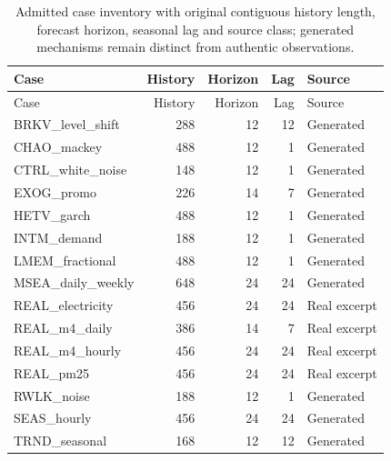 \begin{longtable}{lrrrl}
\caption{Admitted case inventory with original contiguous history length, forecast horizon, seasonal lag and source class; generated mechanisms remain distinct from authentic observations.}\label{tab:cases}\\
\toprule Case & History & Horizon & Lag & Source\\\midrule\endfirsthead
\toprule Case & History & Horizon & Lag & Source\\\midrule\endhead
BRKV\_level\_shift & 288 & 12 & 12 & Generated\\
CHAO\_mackey & 488 & 12 & 1 & Generated\\
CTRL\_white\_noise & 148 & 12 & 1 & Generated\\
EXOG\_promo & 226 & 14 & 7 & Generated\\
HETV\_garch & 488 & 12 & 1 & Generated\\
INTM\_demand & 188 & 12 & 1 & Generated\\
LMEM\_fractional & 488 & 12 & 1 & Generated\\
MSEA\_daily\_weekly & 648 & 24 & 24 & Generated\\
REAL\_electricity & 456 & 24 & 24 & Real excerpt\\
REAL\_m4\_daily & 386 & 14 & 7 & Real excerpt\\
REAL\_m4\_hourly & 456 & 24 & 24 & Real excerpt\\
REAL\_pm25 & 456 & 24 & 24 & Real excerpt\\
RWLK\_noise & 188 & 12 & 1 & Generated\\
SEAS\_hourly & 456 & 24 & 24 & Generated\\
TRND\_seasonal & 168 & 12 & 12 & Generated\\
\bottomrule
\end{longtable}
